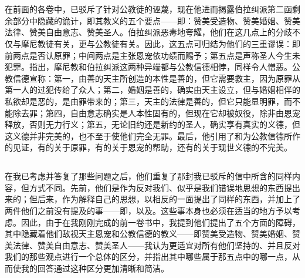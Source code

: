 

\section{}

在前面的各卷中，已驳斥了针对公教徒的诬蔑，现在他进而揭露伯拉纠派第二函剩余部分中隐藏的诡计，即其教义的五个要点——即：赞美受造物、赞美婚姻、赞美法律、赞美自由意志、赞美圣人。伯拉纠派恶毒地夸耀，他们在这几点上的分歧不仅与摩尼教徒有关，更与公教徒有关。因此，这五点可归结为他们的三重谬误：即前两点是否认原罪；中间两点是主张恩宠依功绩而赐予；第五点是声称圣人今生未犯罪。指出，摩尼教和伯拉纠派这两种异端都与公教信德相悖，同样令人憎恶。公教信德宣称：第一，由善的天主所创造的本性是善的，但它需要救主，因为原罪从第一人的过犯传给了众人；第二，婚姻是善的，确实由天主设立，但与婚姻相伴的私欲却是恶的，是由罪带来的；第三，天主的法律是善的，但它只能显明罪，而不能除去罪；第四，自由意志确实是人本性固有的，但现在它却被奴役，除非由恩宠释放，否则无力行义；第五，无论旧约还是新约的圣人，确实享有真实的义德，但这义德并非完美的，也不至于使他们完全无罪。最后，他引用了和为公教信德所作的见证，有的关于原罪，有的关于恩宠的帮助，还有的关于现世义德的不完美。\par


\subsection{}

在我已考虑并答复了那些问题之后，他们重复了那封我已驳斥的信中所含的同样内容，但方式不同。先前，他们是作为反对我们、似乎是我们错误地思想的东西提出来的；但后来，作为解释自己的思想，以相反的一面提出了同样的东西，并加上了两件他们之前没有提及的事——即，以及。这些事本身也必须在适当的地方予以考虑。因此，由于在我刚刚完成的前一卷书中，我提到他们提出了五个方面的障碍，其中隐藏着他们敌视天主恩宠和公教信德的教义——即赞美受造物、赞美婚姻、赞美法律、赞美自由意志、赞美圣人——我认为更适宜对所有他们坚持的、并且反对我们的那些观点进行一个总体的区分，并指出其中哪些属于那五点中的哪一点，从而使我的回答通过这种区分更加清晰和简洁。\par

